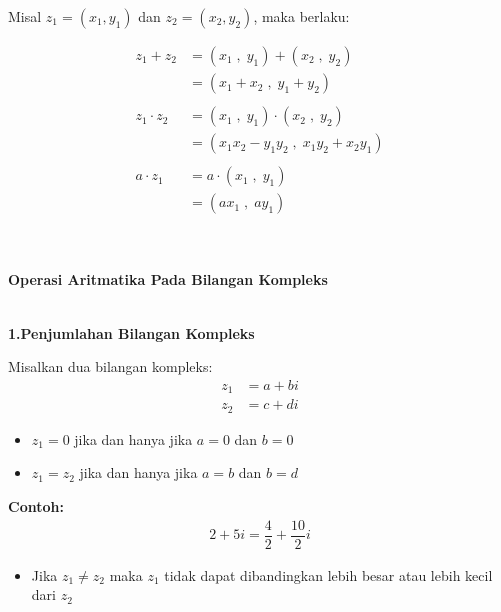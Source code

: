 \documentclass{article}
\begin{document}
    Misal $ z_1 = ( x_1 , y_1 )  $ dan $ z_2 = ( x_2 , y_2 ) $, maka berlaku:

    \begin{align}
            z_1 + z_2   & = ( x_1 \;,\; y_1 ) + ( x_2 \;,\; y_2 )
            \nonumber\\
            & = ( x_1 + x_2 \;,\; y_1 + y_2 )
            \\\nonumber\\
            z_1 \cdot z_2   & = ( x_1 \;,\; y_1 ) \cdot ( x_2 \;,\; y_2 )
                            \nonumber\\
                            & = ( x_1 x_2 - y_1 y_2 \;,\; x_1 y_2 + x_2 y_1 )
                            \\\nonumber\\
            a \cdot z_1 & = a \cdot ( x_1 \;,\; y_1 )
                        \nonumber\\
                        & = ( ax_1 \;,\; ay_1 )
    \end{align}
    \\ \\

    \newpage
    \begin{center}
        \textbf{Operasi Aritmatika Pada Bilangan Kompleks}
    \end{center}
    \leavevmode\\

    \textbf{1.\>Penjumlahan Bilangan Kompleks\\}

    Misalkan dua bilangan kompleks:
    \begin{align}
        z_1 &= a + bi
        \nonumber\\
        z_2 &= c + di
        \nonumber
    \end{align}

    \begin{itemize}
        \item $z_1 = 0$ jika dan hanya jika $a = 0$ dan $b = 0$
        \item $z_1 = z_2$ jika dan hanya jika $a = b$ dan $b = d$
    \end{itemize}

    \textbf{Contoh:}
    \begin{align}
        2 + 5i = \dfrac{4}{2} + \dfrac{10}{2}i \nonumber
    \end{align}
    \begin{itemize}
        \item Jika $z_1 \neq z_2$ maka $z_1$ tidak dapat dibandingkan lebih besar atau lebih kecil dari $z_2$
    \end{itemize}
    \leavevmode
    \\\\
\end{document}
